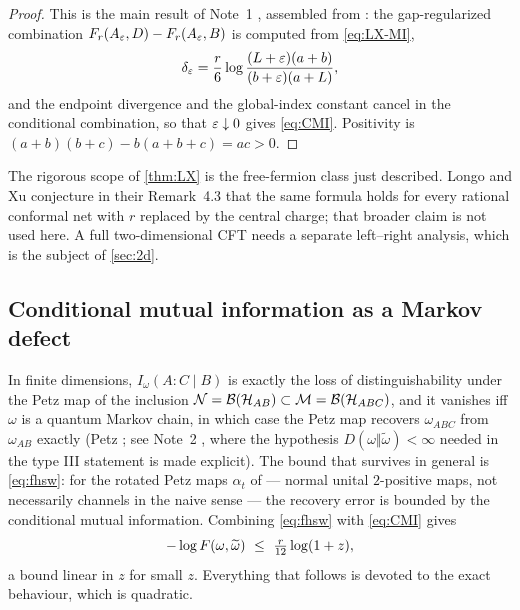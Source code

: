 \begin{proof}
This is the main result of Note~1 \cite{Note1}, assembled from \cite[Thm.~4.1(5),(6)
and Thm.~4.2]{LX}: the gap-regularized combination
$F_r(A_\varepsilon,D)-F_r(A_\varepsilon,B)$ is computed from \eqref{eq:LX-MI},
\begin{equation}\label{eq:delta-eps}
 \delta_\varepsilon=\frac r6\log\frac{(L+\varepsilon)(a+b)}{(b+\varepsilon)(a+L)} ,
\end{equation}
and the endpoint divergence and the global-index constant cancel in the
conditional combination, so that $\varepsilon\downarrow0$ gives \eqref{eq:CMI}.
Positivity is $(a+b)(b+c)-b(a+b+c)=ac>0$.
\end{proof}

\begin{remark}\label{rem:LX-scope}
The rigorous scope of \cref{thm:LX} is the free-fermion class just described.
Longo and Xu conjecture in their Remark~4.3 that the same formula holds for every
rational conformal net with $r$ replaced by the central charge; that broader claim
is not used here.  A full two-dimensional CFT needs a separate left--right
analysis, which is the subject of \cref{sec:2d}.
\end{remark}

\subsection{Conditional mutual information as a Markov defect}
In finite dimensions, $I_\omega(A{:}C\mid B)$ is exactly the loss of
distinguishability under the Petz map of the inclusion
$\mathcal N=\mathcal B(\mathcal H_{AB})\subset\mathcal M=\mathcal B(\mathcal H_{ABC})$, and it vanishes iff
$\omega$ is a quantum Markov chain, in which case the Petz map recovers
$\omega_{ABC}$ from $\omega_{AB}$ exactly (Petz \cite{Petz88}; see Note~2 \cite{Note2}, where
the hypothesis $D(\omega\Vert\widetilde\omega)<\infty$ needed in the
type III statement is made explicit).  The bound that survives in general is
\eqref{eq:fhsw}: for the rotated Petz maps $\alpha_t$ of \cite{FHSW} --- normal
unital $2$-positive maps, not necessarily channels in the naive sense --- the
recovery error is bounded by the conditional mutual information.  Combining
\eqref{eq:fhsw} with \eqref{eq:CMI} gives
\begin{equation}\label{eq:cmi-bound}
 -\log F(\omega,\widetilde\omega)\ \le\ \tfrac r{12}\log(1+z),
\end{equation}
a bound linear in $z$ for small $z$.  Everything that follows is devoted to the
exact behaviour, which is quadratic.

